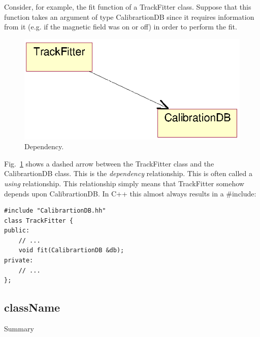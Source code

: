 \begin{Entry}
\begin{Entry}
Consider, for example, the fit function of a TrackFitter class.
Suppose that this function takes an argument of type CalibrartionDB
since it requires information from it (e.g. if the magnetic field was
on or off) in order to perform the fit.
\begin{figure}[htb]
    \begin{center}
        \includegraphics{umlDependency.eps}
        \caption{Dependency.}
        \label{fig:umlDependency}
    \end{center}
\end{figure}
Fig.~\ref{fig:umlDependency} shows a dashed arrow between the
TrackFitter class and the CalibrartionDB class. This is the
\emph{dependency} relationship. This is often called a \emph{using}
relationship.  This relationship simply means that TrackFitter somehow
depends upon CalibrartionDB. In C++ this almost always results in a
\#include:

{\footnotesize
\begin{verbatim}
#include "CalibrartionDB.hh"
class TrackFitter {
public:
    // ...
    void fit(CalibrartionDB &db);
private:
    // ...
};
\end{verbatim}
}%

%
%

\printindex


\bye

%
%

%
%
\subsection{className}
\label{sec:className}
\begin{Entry}
\item[Summary]


\end{Entry}
\end{Entry}
\end{Entry}
